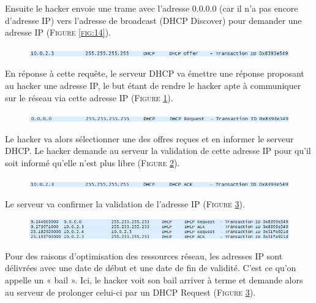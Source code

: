 \documentclass[11pt]{article}
\begin{document}
Ensuite le hacker envoie une trame avec l’adresse 0.0.0.0 (car il n’a pas encore d’adresse IP) vers l’adresse de broadcast (DHCP Discover) pour demander une adresse IP  (\textsc{Figure \ref{fig:14}}).

\begin{figure}[hbtp]
        \centering \includegraphics[scale=0.4]{Exo3/15.png}
        \caption{}
         \label{fig:15}
\end{figure}

En réponse à cette requête, le serveur DHCP va émettre une réponse proposant au hacker une adresse IP, le but étant de rendre le hacker apte à communiquer sur le réseau via cette adresse IP (\textsc{Figure \ref{fig:15}}).

\begin{figure}[hbtp]
        \centering \includegraphics[scale=0.4]{Exo3/16.png}
        \caption{}
         \label{fig:16}
\end{figure}

Le hacker va alors sélectionner une des offres reçues et en informer le serveur DHCP. Le hacker demande au serveur la validation de cette adresse IP pour qu’il soit informé qu’elle n’est plus libre (\textsc{Figure \ref{fig:16}}).

\begin{figure}[hbtp]
        \centering \includegraphics[scale=0.4]{Exo3/17.png}
        \caption{}
         \label{fig:17}
\end{figure}

Le serveur va confirmer la validation de l’adresse IP (\textsc{Figure \ref{fig:17}}).

\begin{figure}[hbtp]
        \centering \includegraphics[scale=0.4]{Exo3/18.png}
        \caption{}
         \label{fig:18}
\end{figure}

Pour des raisons d’optimisation des ressources réseau, les adresses IP sont délivrées avec une date de début et une date de fin de validité. C’est ce qu’on appelle un « bail ». Ici, le hacker voit son bail arriver à terme et demande alors au serveur de prolonger celui-ci par un DHCP Request (\textsc{Figure \ref{fig:17}}).
\end{document}
